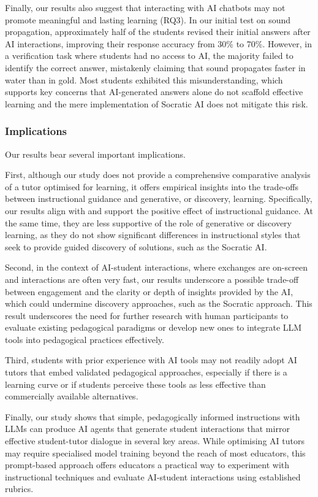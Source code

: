 \documentclass[
  11pt,
]{article}
\begin{document}
Finally, our results also suggest that interacting with AI chatbots may not promote meaningful and lasting learning (RQ3). In our initial test on sound propagation, approximately half of the students revised their initial answers after AI interactions, improving their response accuracy from 30\% to 70\%. However, in a verification task where students had no access to AI, the majority failed to identify the correct answer, mistakenly claiming that sound propagates faster in water than in gold. Most students exhibited this misunderstanding, which supports key concerns that AI-generated answers alone do not scaffold effective learning and the mere implementation of Socratic AI does not mitigate this risk.

\subsubsection{Implications}\label{implications}

Our results bear several important implications.

First, although our study does not provide a comprehensive comparative analysis of a tutor optimised for learning, it offers empirical insights into the trade-offs between instructional guidance and generative, or discovery, learning. Specifically, our results align with and support the positive effect of instructional guidance. At the same time, they are less supportive of the role of generative or discovery learning, as they do not show significant differences in instructional styles that seek to provide guided discovery of solutions, such as the Socratic AI.

Second, in the context of AI-student interactions, where exchanges are on-screen and interactions are often very fast, our results underscore a possible trade-off between engagement and the clarity or depth of insights provided by the AI, which could undermine discovery approaches, such as the Socratic approach. This result underscores the need for further research with human participants to evaluate existing pedagogical paradigms or develop new ones to integrate LLM tools into pedagogical practices effectively.

Third, students with prior experience with AI tools may not readily adopt AI tutors that embed validated pedagogical approaches, especially if there is a learning curve or if students perceive these tools as less effective than commercially available alternatives.

Finally, our study shows that simple, pedagogically informed instructions with LLMs can produce AI agents that generate student interactions that mirror effective student-tutor dialogue in several key areas. While optimising AI tutors may require specialised model training beyond the reach of most educators, this prompt-based approach offers educators a practical way to experiment with instructional techniques and evaluate AI-student interactions using established rubrics.
\end{document}
